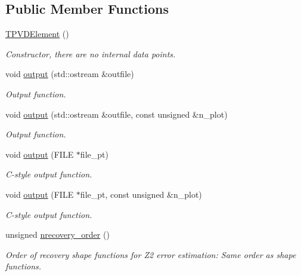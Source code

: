 \subsection*{Public Member Functions}
\begin{DoxyCompactItemize}
\item 
\hyperlink{classoomph_1_1TPVDElement_a1e9ae25f5697a46ae4d53f4db0aafa05}{T\+P\+V\+D\+Element} ()
\begin{DoxyCompactList}\small\item\em Constructor, there are no internal data points. \end{DoxyCompactList}\item 
void \hyperlink{classoomph_1_1TPVDElement_a048f0db11c13863fadc1606483c5a5e2}{output} (std\+::ostream \&outfile)
\begin{DoxyCompactList}\small\item\em Output function. \end{DoxyCompactList}\item 
void \hyperlink{classoomph_1_1TPVDElement_a16716e0b772f7a13b885faeb4def1cfa}{output} (std\+::ostream \&outfile, const unsigned \&n\+\_\+plot)
\begin{DoxyCompactList}\small\item\em Output function. \end{DoxyCompactList}\item 
void \hyperlink{classoomph_1_1TPVDElement_a272dff6c1e74e2634e2df71b33319e19}{output} (F\+I\+LE $\ast$file\+\_\+pt)
\begin{DoxyCompactList}\small\item\em C-\/style output function. \end{DoxyCompactList}\item 
void \hyperlink{classoomph_1_1TPVDElement_a439c64bf9eefec5c472dfe91099c2ffd}{output} (F\+I\+LE $\ast$file\+\_\+pt, const unsigned \&n\+\_\+plot)
\begin{DoxyCompactList}\small\item\em C-\/style output function. \end{DoxyCompactList}\item 
unsigned \hyperlink{classoomph_1_1TPVDElement_a85176c5881f61e045e9783460ca0064f}{nrecovery\+\_\+order} ()
\begin{DoxyCompactList}\small\item\em Order of recovery shape functions for Z2 error estimation\+: Same order as shape functions. \end{DoxyCompactList}\item 

\end{DoxyCompactItemize}
